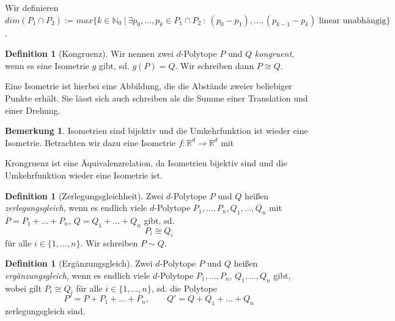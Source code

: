 \documentclass[11pt,titlepage]{article}
\newcommand{\setN}{\mathbb{N}}
\newcommand{\setR}{\mathbb{R}}
\theoremstyle{definition}
\newtheorem{definition}[theorem]{Definition}
\newtheorem{remark}[theorem]{Bemerkung}
\theoremstyle{remark}
\begin{document}
	Wir definieren $dim(P_1\cap P_2):=max\{k\in\setN_0\ \vert\ \exists p_0,\ldots,p_k\in P_1\cap P_2\ :
	\ (p_0-p_1),\dots,(p_{k-1}-p_k)\text{ linear unabhängig}\}$.
	
	\begin{definition}[Kongruenz]
		Wir nennen zwei $d$-Polytope $P$ und $Q$ \textsl{kongruent}, wenn es eine Isometrie $g$ gibt, sd. 
		$g(P)=Q$. Wir schreiben dann $P\cong Q$.
	\end{definition}

	 Eine Isometrie ist hierbei eine Abbildung, die die Abstände zweier beliebiger Punkte erhält. Sie lässt sich auch schreiben als die Summe einer 
	 Translation und einer Drehung.

	\begin{remark}
		Isometrien sind bijektiv und die Umkehrfunktion ist wieder eine 
		Isometrie. Betrachten wir dazu eine Isometrie $f:\setR^d\to \setR^d$ mit 
		
		Krongruenz ist eine Äquivalenzrelation, da Isometrien bijektiv sind und 
		die Umkehrfunktion wieder eine Isometrie ist.
	\end{remark}
	
	\begin{definition}[Zerlegungsgleichheit]
		Zwei $d$-Polytope $P$ und $Q$ heißen \textsl{zerlegungsgleich}, wenn es endlich viele $d$-Polytope 
		$P_1,\ldots,P_n,Q_1,\ldots,Q_n$ mit $P=P_1 +\ldots +P_n$,  $Q=Q_1 +\ldots+Q_n$ 
		gibt, sd. 
		\[P_i\cong Q_i\]
		für alle $i\in\{1,\ldots,n\}$. Wir schreiben $P\sim Q$.
	\end{definition}
	
	\begin{definition}[Ergänzungsgleich]
		Zwei $d$-Polytope $P$ und $Q$ heißen \textsl{ergänzungsgleich}, wenn es endlich viele $d$-Polytope 
		$P_1,\ldots,P_n$, $Q_1,\ldots,Q_n$ gibt, wobei gilt $P_i\cong Q_i$ für alle $i\in\{1,\ldots,n\}$, sd. die Polytope
		\[P'=P+P_1+\ldots+P_n,\qquad Q'=Q+Q_1+\ldots+Q_n\]
		zerlegungsgleich sind.
	\end{definition}
\end{document}
